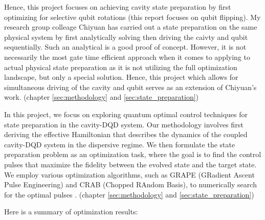 \documentclass[12pt]{report}
\begin{document}
Hence, this project focuses on achieving cavity state preparation by first optimizing for selective qubit rotations (this report focuses on qubit flipping). 
My research group colleage Chiyuan has carried out a state preparation on the same physical system by first analytically solving then driving the caivty and qubit sequentially. 
Such an analytical is a good proof of concept. 
However, it is not necessarily the most gate time efficient approach when it comes to applying to actual physical state preparation as it is not utilizing the full optimization landscape, but only a special solution. 
Hence, this project which allows for simultaneous driving of the cavity and qubit serves as an extension of Chiyuan's work.
(chapter \ref{sec:methodology} and \ref{sec:state_preparation})
\par
In this project, we focus on exploring quantum optimal control techniques for state preparation in the cavity-DQD system. 
Our methodology involves first deriving the effective Hamiltonian that describes the dynamics of the coupled cavity-DQD system in the dispersive regime. 
We then formulate the state preparation problem as an optimization task, where the goal is to find the control pulses that maximize the fidelity between the evolved state and the target state. 
We employ various optimization algorithms, such as GRAPE (GRadient Ascent Pulse Engineering) and CRAB (Chopped RAndom Basis), to numerically search for the optimal pulses \cite{KHANEJA2005296, PhysRevLett.106.190501}. 
(chapter \ref{sec:methodology} and \ref{sec:state_preparation})
\par
Here is a summary of optimization results: 
\end{document}
